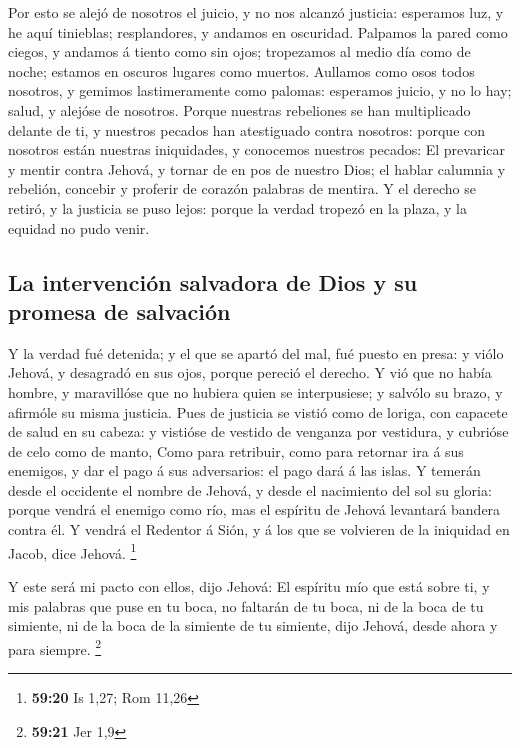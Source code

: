  Por esto se alejó de nosotros el juicio, y no nos alcanzó
justicia: esperamos luz, y he aquí tinieblas; resplandores, y andamos en
oscuridad.  Palpamos la pared como ciegos, y andamos á
tiento como sin ojos; tropezamos al medio día como de noche; estamos en
oscuros lugares como muertos.  Aullamos como osos todos
nosotros, y gemimos lastimeramente como palomas: esperamos juicio, y no
lo hay; salud, y alejóse de nosotros.  Porque nuestras
rebeliones se han multiplicado delante de ti, y nuestros pecados han
atestiguado contra nosotros: porque con nosotros están nuestras
iniquidades, y conocemos nuestros pecados:  El prevaricar y
mentir contra Jehová, y tornar de en pos de nuestro Dios; el hablar
calumnia y rebelión, concebir y proferir de corazón palabras de mentira.
 Y el derecho se retiró, y la justicia se puso lejos:
porque la verdad tropezó en la plaza, y la equidad no pudo venir.

\hypertarget{la-intervenciuxf3n-salvadora-de-dios-y-su-promesa-de-salvaciuxf3n}{%
\subsection{La intervención salvadora de Dios y su promesa de
salvación}\label{la-intervenciuxf3n-salvadora-de-dios-y-su-promesa-de-salvaciuxf3n}}

 Y la verdad fué detenida; y el que se apartó del mal, fué
puesto en presa: y viólo Jehová, y desagradó en sus ojos, porque pereció
el derecho.  Y vió que no había hombre, y maravillóse que
no hubiera quien se interpusiese; y salvólo su brazo, y afirmóle su
misma justicia.  Pues de justicia se vistió como de loriga,
con capacete de salud en su cabeza: y vistióse de vestido de venganza
por vestidura, y cubrióse de celo como de manto,  Como para
retribuir, como para retornar ira á sus enemigos, y dar el pago á sus
adversarios: el pago dará á las islas.  Y temerán desde el
occidente el nombre de Jehová, y desde el nacimiento del sol su gloria:
porque vendrá el enemigo como río, mas el espíritu de Jehová levantará
bandera contra él.  Y vendrá el Redentor á Sión, y á los
que se volvieren de la iniquidad en Jacob, dice Jehová. \footnote{\textbf{59:20}
  Is 1,27; Rom 11,26}

 Y este será mi pacto con ellos, dijo Jehová: El espíritu
mío que está sobre ti, y mis palabras que puse en tu boca, no faltarán
de tu boca, ni de la boca de tu simiente, ni de la boca de la simiente
de tu simiente, dijo Jehová, desde ahora y para siempre. \footnote{\textbf{59:21}
  Jer 1,9}

